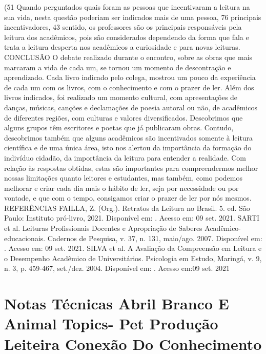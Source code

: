 (51%
Quando perguntados quais foram as pessoas que incentivaram a leitura na sua vida, nesta
questão poderiam ser indicados mais de uma pessoa, 76%
principais incentivadores, 43%
sentido, os professores são os principais responsáveis pela leitura dos acadêmicos, pois são
considerados dependendo da forma que fala e trata a leitura desperta nos acadêmicos a
curiosidade e para novas leituras.
CONCLUSÃO
O debate realizado durante o encontro, sobre as obras que mais marcaram a vida de cada
um, se tornou um momento de descontração e aprendizado. Cada livro indicado pelo colega,
mostrou um pouco da experiência de cada um com os livros, com o conhecimento e com o
prazer de ler.
Além dos livros indicados, foi realizado um momento cultural, com apresentações de
danças, músicas, canções e declamações de poesia autoral ou não, de acadêmicos de diferentes
regiões, com culturas e valores diversificados. Descobrimos que alguns grupos têm escritores e
poetas que já publicaram obras. Contudo, descobrimos também que alguns acadêmicos são
incentivados somente à leitura científica e de uma única área, isto nos alertou da importância da
formação do indivíduo cidadão, da importância da leitura para entender a realidade.
Com relação às respostas obtidas, estas são importantes para compreendermos melhor
nossas limitações quanto leitores e estudantes, mas também, como podemos melhorar e criar
cada dia mais o hábito de ler, seja por necessidade ou por vontade, e que com o tempo,
consigamos criar o prazer de ler por nós mesmos.
REFERÊNCIAS
FAILLA, Z. (Org.). Retratos da Leitura no Brasil. 5. ed. São Paulo: Instituto pró-livro, 2021.
Disponível em:
. Acesso em: 09 set. 2021.
SARTI et al. Leituras Profissionais Docentes e Apropriação de Saberes
Acadêmico-educacionais. Cadernos de Pesquisa, v. 37, n. 131, maio/ago. 2007. Disponível em:
. Acesso
em: 09 set. 2021.
SILVA et al. A Avaliação da Compreensão em Leitura e o Desempenho Acadêmico de
Universitários. Psicologia em Estudo, Maringá, v. 9, n. 3, p. 459-467, set./dez. 2004. Disponível
em: .
Acesso em:09 set. 2021




\section*{Notas Técnicas Abril Branco  E Animal Topics- Pet Produção Leiteira Conexão Do Conhecimento}

